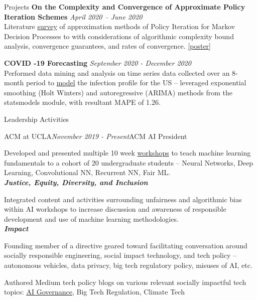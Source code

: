 \documentclass{resume}
\begin{document}
\begin{rSection}{Projects}
{\bf On the Complexity and Convergence of Approximate Policy Iteration Schemes} \hfill {\em April 2020 – June 2020}
\\Literature \href{https://github.com/joostinyi/ECE239AS/blob/master/RL_S20.pdf}{survey} of approximation methods of Policy Iteration
for Markov Decision Processes to with considerations of algorithmic complexity bound analysis, convergence guarantees, and rates of convergence. 
\href{https://github.com/joostinyi/ECE239AS/blob/master/Approximate-Policy-Iteration-Poster.pdf}{[poster]}

{\bf COVID -19 Forecasting} \hfill {\em September 2020 - December 2020}
\\Performed data mining and analysis on time series data collected over an 8-month period to \href{https://github.com/yashlala/cs-145-project}{model} the infection profile
for the US – leveraged exponential smoothing (Holt Winters) and autoregressive (ARIMA) methods from the statsmodels module, with resultant MAPE of 1.26.

\end{rSection}

\begin{rSection}{Leadership Activities}
    \begin{rSubsection}{ACM at UCLA}{\em November 2019 - Present}{ACM AI President}{}
        \item Developed and presented multiple 10 week \href{https://www.youtube.com/playlist?list=PLPO7_kXilXFYGa-3ZpOXa7Z01ZYAtUh1U}{workshops}
        to teach machine learning fundamentals to a cohort of 20 undergraduate students – Neural Networks, Deep Learning, Convolutional NN, Recurrent NN, Fair ML.\\
        {\textbf{\em Justice, Equity, Diversity, and Inclusion}}
        \item Integrated content and activities surrounding unfairness and algorithmic bias within AI workshops to increase discussion and awareness
        of responsible development and use of machine learning methodologies.\\
        {\textbf{\em Impact}}
        \item Founding member of a directive geared toward facilitating conversation around socially responsible engineering, social impact technology, and tech policy
        – autonomous vehicles, data privacy, big tech regulatory policy, misuses of AI, etc.
        \item Authored Medium tech policy blogs on various relevant socially impactful tech topics: \href{https://medium.com/impact-labs/considerations-for-the-future-of-ai-governance-46d727012c5b}{AI Governance}, Big Tech Regulation, Climate Tech
    \end{rSubsection}
\end{rSection}
\end{document}
